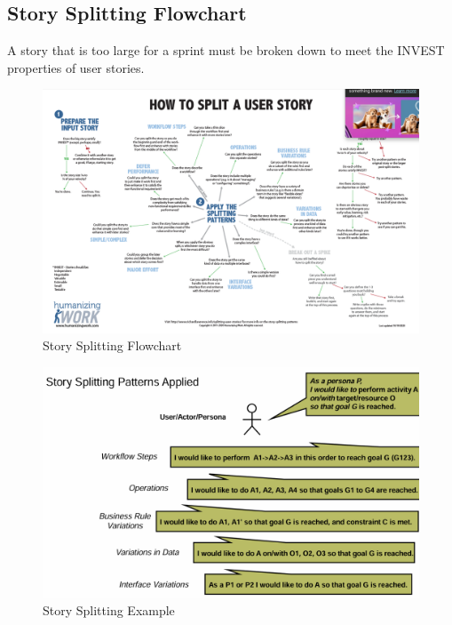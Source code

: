 \documentclass[../Main.tex]{subfiles}
\begin{document}

\newpage

\subsection{Story Splitting Flowchart}
A story that is too large for a sprint must be broken down
to meet the INVEST properties of user stories.
\begin{figure}[H]
    \centering
    \includegraphics[angle=90,height=1\textwidth]{Images/storysplitting.png}
    \caption{Story Splitting Flowchart}
\end{figure}
\newpage

\begin{figure}[H]
    \centering
    \includegraphics{Images/appliedstorysplitting.png}
    \caption{Story Splitting Example}
\end{figure}
\end{document}
